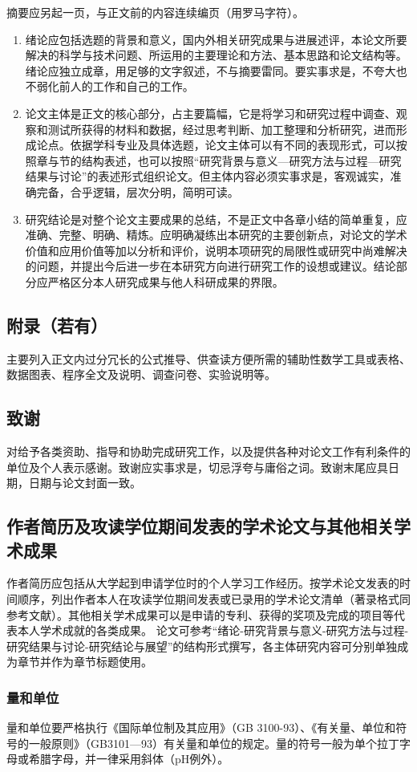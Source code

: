 摘要应另起一页，与正文前的内容连续编页（用罗马字符）。

\begin{enumerate}
    \item 绪论应包括选题的背景和意义，国内外相关研究成果与进展述评，本论文所要解决的科学与技术问题、所运用的主要理论和方法、基本思路和论文结构等。绪论应独立成章，用足够的文字叙述，不与摘要雷同。要实事求是，不夸大也不弱化前人的工作和自己的工作。
    \item 论文主体是正文的核心部分，占主要篇幅，它是将学习和研究过程中调查、观察和测试所获得的材料和数据，经过思考判断、加工整理和分析研究，进而形成论点。依据学科专业及具体选题，论文主体可以有不同的表现形式，可以按照章与节的结构表述，也可以按照“研究背景与意义—研究方法与过程—研究结果与讨论”的表述形式组织论文。但主体内容必须实事求是，客观诚实，准确完备，合乎逻辑，层次分明，简明可读。
    \item 研究结论是对整个论文主要成果的总结，不是正文中各章小结的简单重复，应准确、完整、明确、精炼。应明确凝练出本研究的主要创新点，对论文的学术价值和应用价值等加以分析和评价，说明本项研究的局限性或研究中尚难解决的问题，并提出今后进一步在本研究方向进行研究工作的设想或建议。结论部分应严格区分本人研究成果与他人科研成果的界限。
\end{enumerate}
\subsection{附录（若有）}
主要列入正文内过分冗长的公式推导、供查读方便所需的辅助性数学工具或表格、数据图表、程序全文及说明、调查问卷、实验说明等。
\subsection{致谢}
对给予各类资助、指导和协助完成研究工作，以及提供各种对论文工作有利条件的单位及个人表示感谢。致谢应实事求是，切忌浮夸与庸俗之词。致谢末尾应具日期，日期与论文封面一致。
\subsection{作者简历及攻读学位期间发表的学术论文与其他相关学术成果}
作者简历应包括从大学起到申请学位时的个人学习工作经历。按学术论文发表的时间顺序，列出作者本人在攻读学位期间发表或已录用的学术论文清单（著录格式同参考文献）。其他相关学术成果可以是申请的专利、获得的奖项及完成的项目等代表本人学术成就的各类成果。
论文可参考“绪论-研究背景与意义-研究方法与过程-研究结果与讨论-研究结论与展望”的结构形式撰写，各主体研究内容可分别单独成为章节并作为章节标题使用。

\subsubsection{量和单位}
量和单位要严格执行《国际单位制及其应用》（GB 3100-93）、《有关量、单位和符号的一般原则》（GB3101—93）有关量和单位的规定。量的符号一般为单个拉丁字母或希腊字母，并一律采用斜体（pH例外）。

